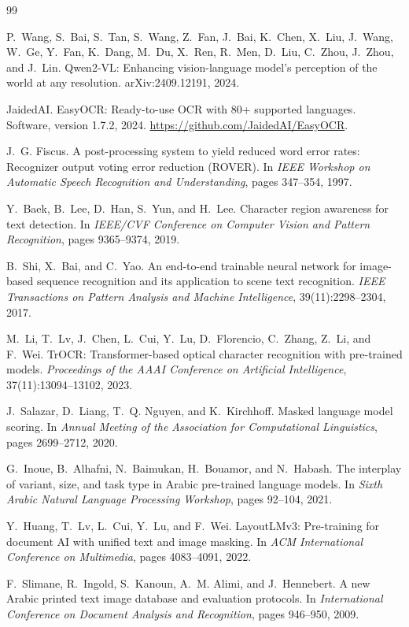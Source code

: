 \documentclass[11pt,a4paper]{article}
\begin{document}
\begin{thebibliography}{99}
\small

P.~Wang, S.~Bai, S.~Tan, S.~Wang, Z.~Fan, J.~Bai, K.~Chen, X.~Liu, J.~Wang,
W.~Ge, Y.~Fan, K.~Dang, M.~Du, X.~Ren, R.~Men, D.~Liu, C.~Zhou, J.~Zhou, and
J.~Lin. Qwen2-VL: Enhancing vision-language model's perception of the world at
any resolution. arXiv:2409.12191, 2024.

JaidedAI. EasyOCR: Ready-to-use OCR with 80+ supported languages. Software,
version 1.7.2, 2024. \url{https://github.com/JaidedAI/EasyOCR}.

J.~G. Fiscus. A post-processing system to yield reduced word error rates:
Recognizer output voting error reduction (ROVER). In \emph{IEEE Workshop on
Automatic Speech Recognition and Understanding}, pages 347--354, 1997.

Y.~Baek, B.~Lee, D.~Han, S.~Yun, and H.~Lee. Character region awareness for
text detection. In \emph{IEEE/CVF Conference on Computer Vision and Pattern
Recognition}, pages 9365--9374, 2019.

B.~Shi, X.~Bai, and C.~Yao. An end-to-end trainable neural network for
image-based sequence recognition and its application to scene text
recognition. \emph{IEEE Transactions on Pattern Analysis and Machine
Intelligence}, 39(11):2298--2304, 2017.

M.~Li, T.~Lv, J.~Chen, L.~Cui, Y.~Lu, D.~Florencio, C.~Zhang, Z.~Li, and
F.~Wei. TrOCR: Transformer-based optical character recognition with
pre-trained models. \emph{Proceedings of the AAAI Conference on Artificial
Intelligence}, 37(11):13094--13102, 2023.

J.~Salazar, D.~Liang, T.~Q. Nguyen, and K.~Kirchhoff. Masked language model
scoring. In \emph{Annual Meeting of the Association for Computational
Linguistics}, pages 2699--2712, 2020.

G.~Inoue, B.~Alhafni, N.~Baimukan, H.~Bouamor, and N.~Habash. The interplay of
variant, size, and task type in Arabic pre-trained language models. In
\emph{Sixth Arabic Natural Language Processing Workshop}, pages 92--104, 2021.

Y.~Huang, T.~Lv, L.~Cui, Y.~Lu, and F.~Wei. LayoutLMv3: Pre-training for
document AI with unified text and image masking. In \emph{ACM International
Conference on Multimedia}, pages 4083--4091, 2022.

F.~Slimane, R.~Ingold, S.~Kanoun, A.~M. Alimi, and J.~Hennebert. A new Arabic
printed text image database and evaluation protocols. In \emph{International
Conference on Document Analysis and Recognition}, pages 946--950, 2009.


\end{thebibliography}
\end{document}
